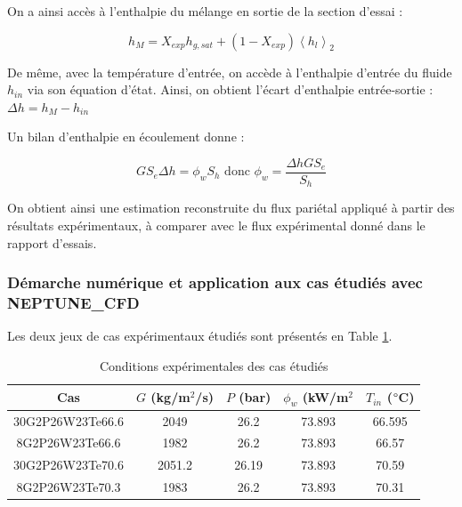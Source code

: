 \npar

On a ainsi accès à l'enthalpie du mélange en sortie de la section d'essai :

\begin{equation}
h_{M}=X_{exp}h_{g,sat}+\left(1-X_{exp}\right)\left<h_{l}\right>_{2}
\end{equation}

De même, avec la température d'entrée, on accède à l'enthalpie d'entrée du fluide $h_{in}$ via son équation d'état. Ainsi, on obtient l'écart d'enthalpie entrée-sortie : $\Delta h=h_{M}-h_{in}$

\npar

Un bilan d'enthalpie en écoulement donne :

\begin{equation}
G S_{e} \Delta h=\phi_{w}S_{h} \text{ donc } \phi_{w}=\frac{\Delta h G S_{e}}{S_{h}}
\end{equation}

On obtient ainsi une estimation reconstruite du flux pariétal appliqué à partir des résultats expérimentaux, à comparer avec le flux expérimental donné dans le rapport d'essais. 

\clearpage

\subsubsection{Démarche numérique et application aux cas étudiés avec NEPTUNE\_CFD}
\label{sec:appli}

Les deux jeux de cas expérimentaux étudiés sont présentés en Table \ref{tab:cond_exp}.

\begin{table}[!h]
\label{tab:cond_exp}
\centering

\begin{tabular}{|c||c|c|c|c|}
\hline
Cas & $G$ (kg/m$^{2}$/s) & $P$ (bar) & $\phi_{w}$ (kW/m$^{2}$& $T_{in}$ ($\degree$C) \\
\hline
\hline
30G2P26W23Te66.6 & 2049 & 26.2 & 73.893 & 66.595\\
8G2P26W23Te66.6 & 1982 & 26.2 & 73.893 & 66.57\\
\hline
\hline
30G2P26W23Te70.6 & 2051.2 & 26.19 & 73.893 & 70.59\\
8G2P26W23Te70.3 & 1983 & 26.2 & 73.893 & 70.31\\
\hline
\end{tabular}

\caption{Conditions expérimentales des cas étudiés}

\end{table}


